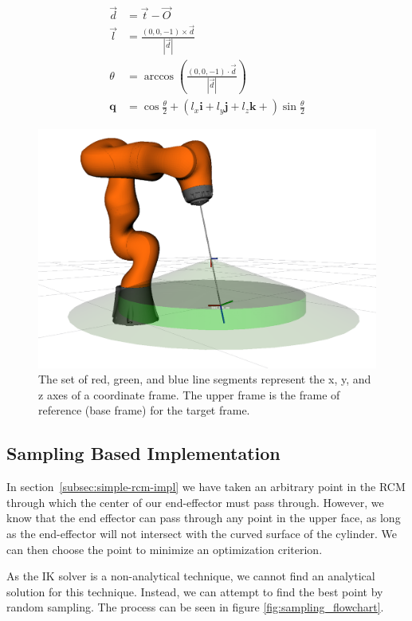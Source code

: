 \documentclass[BTech]{iitmdiss}
\begin{document}
    \begin{align}
        \vec{d} &= \vec{t} - \vec{O} \\
        \vec{l} &= \frac{(0, 0, -1) \times \vec{d}}{|\vec{d}|} \\
        \theta &= \arccos{\left(\frac{(0, 0, -1) \cdot \vec{d}}{|\vec{d}|}\right)} \\
        \mathbf{q} &= \cos{\frac{\theta}{2}} + \left(l_x \mathbf{i} + l_y \mathbf{j} + l_z \mathbf{k} + \right) \sin{\frac{\theta}{2}} \label{eqn:final_q}
    \end{align}


    \begin{figure}
        \centering
        \includegraphics[width=0.5 \linewidth]{./img/coordinate_frames}
        \caption{The set of red, green, and blue line segments represent the x, y, and z axes of a coordinate frame.
        The upper frame is the frame of reference (base frame) for the target frame.}
        \label{fig:coordinate_frames}
    \end{figure}

    \subsection{Sampling Based Implementation}\label{sec:sampling_rcm}


    In section~\ref{subsec:simple-rcm-impl} we have taken an arbitrary point in the RCM through which the center of our
    end-effector must pass through.
    However, we know that the end effector can pass through any point in the upper face,
    as long as the end-effector will not intersect with the curved surface of the cylinder.
    We can then choose the point to minimize an optimization criterion.

    As the IK solver is a non-analytical technique, we cannot find an analytical solution for this technique.
    Instead, we can attempt to find the best point by random sampling. The process can be seen in figure \ref{fig:sampling_flowchart}.
\end{document}
